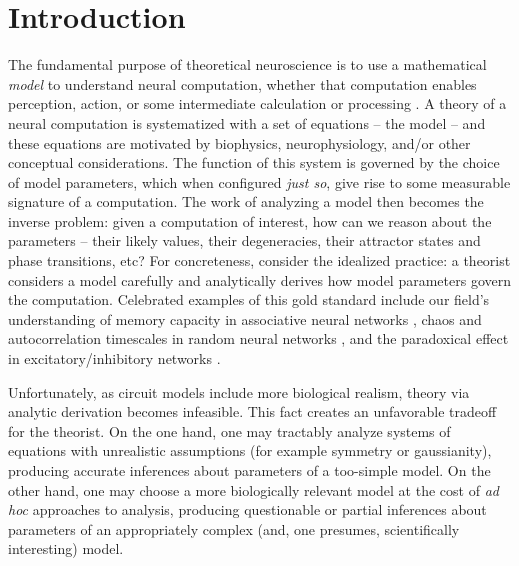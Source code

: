 \documentclass[11pt]{article}
\begin{document}
\section{Introduction}

The fundamental purpose of theoretical neuroscience is to use a mathematical \emph{model} to understand neural computation, whether that computation enables perception, action, or some intermediate calculation or processing \cite{abbott2008theoretical}.  
A theory of a neural computation is systematized with a set of equations -- the model -- and these equations are motivated by biophysics, neurophysiology, and/or other conceptual considerations.
The function of this system is governed by the choice of model parameters, which when configured \emph{just so}, give rise to some measurable signature of a computation.   
The work of analyzing a model then becomes the inverse problem: given a computation of interest, how can we reason about the parameters -- their likely values, their degeneracies, their attractor states and phase transitions, etc?  
For concreteness, consider the idealized practice: a theorist considers a model carefully and analytically derives how model parameters govern the computation.  
Celebrated examples of this gold standard include our field's understanding of memory capacity in associative neural networks \cite{hopfield1984neurons}, chaos and autocorrelation timescales in random neural networks \cite{sompolinsky1988chaos}, and the paradoxical effect in excitatory/inhibitory networks \cite{tsodyks1997paradoxical}.  

Unfortunately, as circuit models include more biological realism, theory via analytic derivation becomes infeasible.  
This fact creates an unfavorable tradeoff for the theorist.  On the one hand, one may tractably analyze systems of equations with unrealistic assumptions (for example symmetry or gaussianity), producing accurate inferences about parameters of a too-simple model.  On the other hand, one may choose a more biologically relevant model at the cost of \emph{ad hoc} approaches to analysis, producing questionable or partial inferences about parameters of an appropriately complex (and, one presumes, scientifically interesting) model.  %
\end{document}
